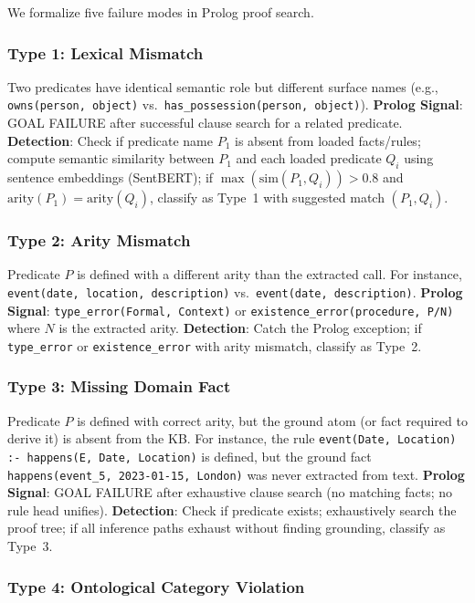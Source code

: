 \documentclass[11pt,letterpaper]{article}
\begin{document}
We formalize five failure modes in Prolog proof search.

\subsubsection{Type 1: Lexical Mismatch}

Two predicates have identical semantic role but different surface names (e.g., \texttt{owns(person, object)} vs.\ \texttt{has\_possession(person, object)}). \textbf{Prolog Signal}: GOAL FAILURE after successful clause search for a related predicate. \textbf{Detection}: Check if predicate name $P_1$ is absent from loaded facts/rules; compute semantic similarity between $P_1$ and each loaded predicate $Q_i$ using sentence embeddings (SentBERT); if $\max(\text{sim}(P_1, Q_i)) > 0.8$ and $\text{arity}(P_1) = \text{arity}(Q_i)$, classify as Type~1 with suggested match $(P_1, Q_i)$.

\subsubsection{Type 2: Arity Mismatch}

Predicate $P$ is defined with a different arity than the extracted call. For instance, \texttt{event(date, location, description)} vs.\ \texttt{event(date, description)}. \textbf{Prolog Signal}: \texttt{type\_error(Formal, Context)} or \texttt{existence\_error(procedure, P/N)} where $N$ is the extracted arity. \textbf{Detection}: Catch the Prolog exception; if \texttt{type\_error} or \texttt{existence\_error} with arity mismatch, classify as Type~2.

\subsubsection{Type 3: Missing Domain Fact}

Predicate $P$ is defined with correct arity, but the ground atom (or fact required to derive it) is absent from the KB. For instance, the rule \texttt{event(Date, Location) :- happens(E, Date, Location)} is defined, but the ground fact \texttt{happens(event\_5, 2023-01-15, London)} was never extracted from text. \textbf{Prolog Signal}: GOAL FAILURE after exhaustive clause search (no matching facts; no rule head unifies). \textbf{Detection}: Check if predicate exists; exhaustively search the proof tree; if all inference paths exhaust without finding grounding, classify as Type~3.

\subsubsection{Type 4: Ontological Category Violation}
\end{document}
